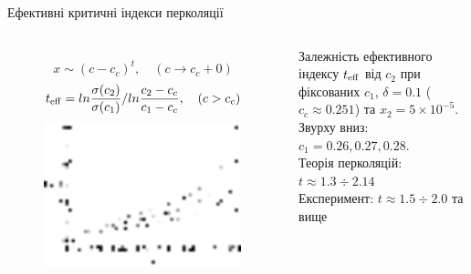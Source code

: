 \documentclass[10pt]{beamer}
\begin{document}
\begin{frame}{Ефективні критичні індекси перколяції}
\footnotesize

\vspace{-15pt}
\begin{columns}[T,onlytextwidth]
      \begin{figure}
        \centering
        $$x \sim (c-c_c)^t, \quad (c \to c_c+0)$$
        $$t_{\rm eff} = ln \frac{\sigma(c_2)}{\sigma(c_1)} / ln \frac{c_2-c_c}{c_1 - c_c}, \quad (c>c_c)$$
        \includegraphics[width=0.99\textwidth]{images/teff.eps}
      \end{figure}
        Залежність ефективного індексу $t_{\rm eff}$ від $c_2$ при фіксованих $c_1$, $\delta=0.1$ ($c_c \approx 0.251$) та $x_2 = 5\times 10^{-5}$. Звурху вниз: $c_1 = 0.26, 0.27, 0.28$.\\
        Теорія перколяцій: $t \approx 1.3 \div 2.14$\\
        Експеримент: $t\approx 1.5 \div 2.0$ та вище


\end{columns}
\end{frame}
\end{document}
